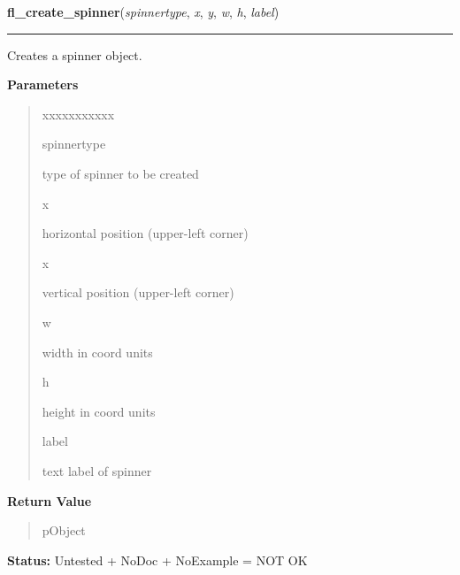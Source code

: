 \hspace{.8\funcindent}\begin{boxedminipage}{\funcwidth}

    \raggedright \textbf{fl\_create\_spinner}(\textit{spinnertype}, \textit{x}, \textit{y}, \textit{w}, \textit{h}, \textit{label})

    \vspace{-1.5ex}

    \rule{\textwidth}{0.5\fboxrule}
\setlength{\parskip}{2ex}
    Creates a spinner object.

\setlength{\parskip}{1ex}
      \textbf{Parameters}
      \vspace{-1ex}

      \begin{quote}
        \begin{Ventry}{xxxxxxxxxxx}

          \item[spinnertype]

          type of spinner to be created

          \item[x]

          horizontal position (upper-left corner)

          \item[x]

          vertical position (upper-left corner)

          \item[w]

          width in coord units

          \item[h]

          height in coord units

          \item[label]

          text label of spinner

        \end{Ventry}

      \end{quote}

      \textbf{Return Value}
    \vspace{-1ex}

      \begin{quote}
      pObject

      \end{quote}

\textbf{Status:} Untested + NoDoc + NoExample = NOT OK



    \end{boxedminipage}

